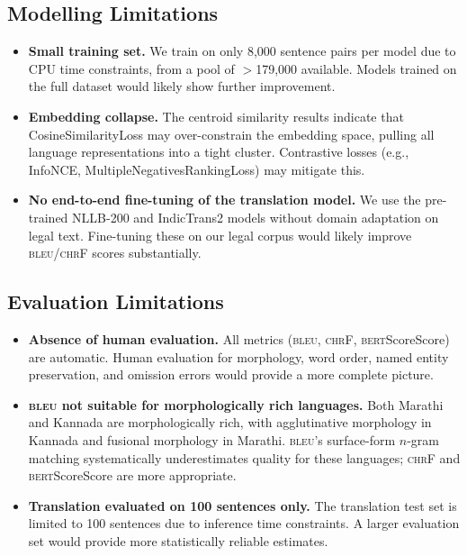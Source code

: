 \documentclass[11pt,a4paper]{article}
\newcommand{\bleu}{\textsc{bleu}}
\newcommand{\chrf}{\textsc{chr}F}
\newcommand{\bert}{\textsc{bert}Score}
\begin{document}
\subsection{Modelling Limitations}
\begin{itemize}[leftmargin=*]
  \item \textbf{Small training set.}
    We train on only 8,000 sentence pairs per model due to
    CPU time constraints, from a pool of $>$179,000 available.
    Models trained on the full dataset would likely show
    further improvement.

  \item \textbf{Embedding collapse.}
    The centroid similarity results indicate that
    CosineSimilarityLoss may over-constrain the embedding
    space, pulling all language representations into
    a tight cluster.
    Contrastive losses (e.g., InfoNCE, MultipleNegativesRankingLoss)
    may mitigate this.

  \item \textbf{No end-to-end fine-tuning of the translation model.}
    We use the pre-trained NLLB-200 and IndicTrans2 models
    without domain adaptation on legal text.
    Fine-tuning these on our legal corpus would likely
    improve \bleu{}/\chrf{} scores substantially.
\end{itemize}

\subsection{Evaluation Limitations}
\begin{itemize}[leftmargin=*]
  \item \textbf{Absence of human evaluation.}
    All metrics (\bleu{}, \chrf{}, \bert{}Score) are automatic.
    Human evaluation for morphology, word order, named entity
    preservation, and omission errors would provide a more
    complete picture.

  \item \textbf{\bleu{} not suitable for morphologically rich
    languages.}
    Both Marathi and Kannada are morphologically rich, with
    agglutinative morphology in Kannada and fusional morphology
    in Marathi.
    \bleu{}'s surface-form $n$-gram matching systematically
    underestimates quality for these languages;
    \chrf{} and \bert{}Score are more appropriate.

  \item \textbf{Translation evaluated on 100 sentences only.}
    The translation test set is limited to 100 sentences due
    to inference time constraints.
    A larger evaluation set would provide more statistically
    reliable estimates.
\end{itemize}
\end{document}
